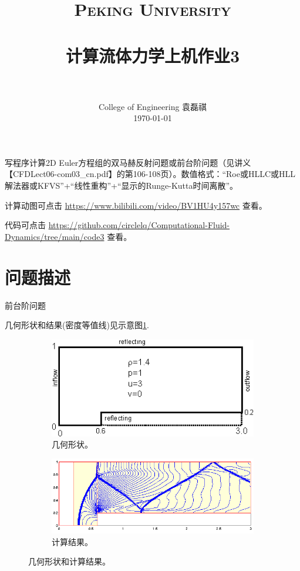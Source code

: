 \documentclass[12pt]{article}
\title{
		\vspace{-1in} 	
		\usefont{OT1}{bch}{b}{n}
		\normalfont \normalsize \textsc{\LARGE Peking University}\\[0.2cm] %
		\horrule{0.5pt} \\[0.2cm]
		\huge \bfseries{计算流体力学上机作业3} \\[-0.2cm]
		\horrule{2pt} \\[0.2cm]
}
\author{
		\normalfont 								\normalsize
		College of Engineering \quad 2001111690  \quad 袁磊祺\\	\normalsize
        \today
}
\date{}
\begin{document}


\maketitle


写程序计算2D Euler方程组的双马赫反射问题或前台阶问题（见讲义【CFDLect06-com03_cn.pdf】的第106-108页）。数值格式：“Roe或HLLC或HLL解法器或KFVS”+“线性重构”+“显示的Runge-Kutta时间离散”。

计算动图可点击 \href{https://www.bilibili.com/video/BV1HU4y157wc}{https://www.bilibili.com/video/BV1HU4y157wc} 查看。

代码可点击 \href{https://github.com/circlelq/Computational-Fluid-Dynamics/tree/main/code3}{https://github.com/circlelq/Computational-Fluid-Dynamics/tree/main/code3} 查看。

\section{问题描述}

前台阶问题

几何形状和结果(密度等值线)见示意图\cref{fig:init}.

\begin{figure}
	\centering
	\begin{subfigure}[b]{0.49\textwidth}
		\centering
		\includegraphics[width=\textwidth]{pro1.png}
		\caption{几何形状。}
	\end{subfigure}
	\hfill
	\begin{subfigure}[b]{0.49\textwidth}
		\centering
		\includegraphics[width=\textwidth]{pro2.png}
		\caption{计算结果。}
	\end{subfigure}
	\caption{几何形状和计算结果。}
	\label{fig:init}
\end{figure}
\end{document}
